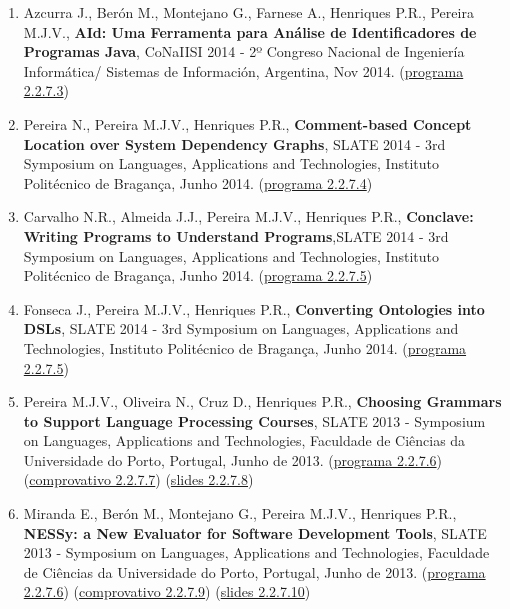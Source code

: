\documentclass[11pt]{article}
\begin{document}
\begin{enumerate}
\item {Azcurra J., Berón M., Montejano G., Farnese A., Henriques P.R., Pereira M.J.V., {\bf{ AId: Uma Ferramenta para Análise de Identificadores de Programas Java}}, CoNaIISI 2014 - 2º Congreso Nacional de Ingeniería Informática/ Sistemas de Información, Argentina, Nov 2014. (\href{run:ComunicacoesOrais/programas/CoN2014prog.pdf}{programa 2.2.7.3})}

\item {Pereira N., Pereira M.J.V., Henriques P.R., {\bf{ Comment-based Concept Location over System Dependency Graphs}}, SLATE 2014 - 3rd Symposium on Languages, Applications and Technologies, Instituto Politécnico de Bragança, Junho 2014. (\href{run:ComunicacoesOrais/programas/SLATE2014prog.pdf}{programa 2.2.7.4})}

\item {Carvalho N.R., Almeida J.J., Pereira M.J.V., Henriques P.R., {\bf{ Conclave: Writing Programs to Understand Programs}},SLATE 2014 - 3rd Symposium on Languages, Applications and Technologies, Instituto Politécnico de Bragança, Junho 2014. (\href{run:ComunicacoesOrais/programas/SLATE2014prog.pdf}{programa 2.2.7.5})}

\item {Fonseca J., Pereira M.J.V., Henriques P.R., {\bf{ Converting Ontologies into DSLs}}, SLATE 2014 - 3rd Symposium on Languages, Applications and Technologies, Instituto Politécnico de Bragança, Junho 2014. (\href{run:ComunicacoesOrais/programas/SLATE2014prog.pdf}{programa 2.2.7.5})}

\item {Pereira M.J.V., Oliveira N., Cruz D., Henriques P.R., {\bf{ Choosing Grammars to Support Language Processing Courses}}, SLATE 2013 - Symposium on Languages, Applications and Technologies, Faculdade de Ciências da Universidade do Porto, Portugal, Junho de 2013. (\href{run:ComunicacoesOrais/programas/SLATE2013prog.pdf}{programa 2.2.7.6}) (\href{run:ComunicacoesOrais/programas/SLATE2013ChooComp.pdf}{comprovativo 2.2.7.7}) (\href{run:ComunicacoesOrais/Slate13apres.pdf}{slides 2.2.7.8})}

\item {Miranda E., Berón M., Montejano G., Pereira M.J.V., Henriques P.R., {\bf{ NESSy: a New Evaluator for Software Development Tools}}, SLATE 2013 - Symposium on Languages, Applications and Technologies, Faculdade de Ciências da Universidade do Porto, Portugal, Junho de 2013. (\href{run:ComunicacoesOrais/programas/SLATE2013prog.pdf}{programa 2.2.7.6}) (\href{run:ComunicacoesOrais/programas/SLATE2013NessyComp.pdf}{comprovativo 2.2.7.9}) (\href{run:ComunicacoesOrais/Slate13Nessyapres.pdf}{slides 2.2.7.10})}


\end{enumerate}
\end{document}
